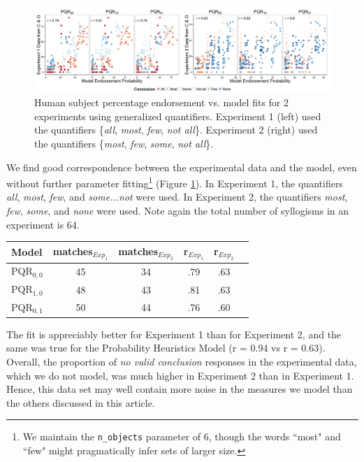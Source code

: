 \documentclass[10pt,letterpaper]{article}
\begin{document}
\begin{figure}[t]
	\centering
  \includegraphics[width=\textwidth]{fig3_multiScatter_colorset_AMFO_MFIE_n6_alpha2}
      \caption{Human subject percentage endorsement vs. model fits for 2 experiments using generalized quantifiers. Experiment 1 (left) used the quantifiers \{\emph{all}, \emph{most}, \emph{few}, \emph{not all}\}. Experiment 2 (right) used the quantifiers \{\emph{most}, \emph{few}, \emph{some}, \emph{not all}\}.}
  \label{fig:mfScatter}
\end{figure}


We find good correspondence between the experimental data and the model, even without further parameter fitting\footnote{We maintain the \lstinline{n_objects} parameter of 6, though the words ``most" and ``few" might pragmatically infer sets of larger size.} (Figure \ref{fig:mfScatter}). In Experiment 1, the quantifiers \emph{all}, \emph{most}, \emph{few}, and \emph{some...not} were used. In Experiment 2, the quantifiers \emph{most}, \emph{few}, \emph{some}, and \emph{none} were used. Note again the total number of syllogisms in an experiment is 64.

\begin{tabular}{l*{4}{c}r}
Model              & matches$_{Exp_{1}}$ & matches$_{Exp_{2}}$ & r$_{Exp_{1}}$ & r$_{Exp_{2}}$  \\
\hline
PQR$_{0,0}$ & 45 & 34 & .79 & .63  \\
PQR$_{1,0}$ & 48 & 43 & .81 & .63 &   \\
PQR$_{0,1}$ & 50 & 44 & .76 & .60  \\
\end{tabular}

%

%
The fit is appreciably better for Experiment 1 than for Experiment 2, and the same was true for the Probability Heuristics Model (r = 0.94 vs r = 0.63). Overall, the proportion of \emph{no valid conclusion} responses in the experimental data, which we do not model, was much higher in Experiment 2 than in Experiment 1. Hence, this data set may well contain more noise in the measures we model than the others discussed in this article. 
\end{document}
